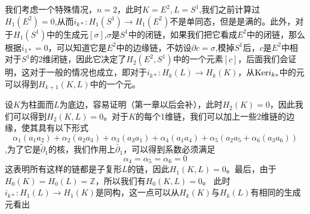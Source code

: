   我们考虑一个特殊情况，$n=2$，此时$K=E^{2},L=S^{1}$,我们之前计算过$H_{1}(E^{2})=0$,从而$i_{k*}:H_{1}(S^{1})\rightarrow H_{1}(E^{2})$不是单同态，但是是满的。此外，对于$H_{1}(S^{1})$中的生成元$[\sigma]$,$\sigma$是$S^{1}$中的闭链，如果我们把它看成$E^{2}$中的闭链，那么根据$i_{1*}=0$，可以知道它是$E^{2}$中的边缘链，不妨设$\partial c=\sigma$,模掉$S^{1}$后，$c$是$E^{2}$中相对于$S^{1}$的2维闭链，因此它决定了$H_{2}(E^{2},S^{1})$中的一个元素$[c]$，后面我们会证明，这对于一般的情况也成立，即对于$i_{k*}:H_{k}(L)\rightarrow H_{k}(K)$，从${\rm Ker} i_{k*}$中的元可以得到$H_{k+1}(K,L)$中的一个元。
  \begin{example}
  设$K$为柱面而$L$为底边，容易证明（第一章以后会补），此时$H_{2}(K)=0$，因此我们可以得到$H_{2}(K,L)=0$。对于$K$的每个1维链，我们可以加上一些2维链的边缘，使其具有以下形式$$\alpha_{1}(a_{1}a_{2})+\alpha_{2}(a_{2}a_{3})+\alpha_{3}(a_{3}a_{1})+\alpha_{4}(a_{1}a_{4})+\alpha_{5}(a_{2}a_{5}+\alpha_{6}(a_{3}a_{6}))$$,为了它是$\tilde{\partial}_{1}$的核，我们作用上$\tilde{\partial_{1}}$，可以得到系数必须满足$$\alpha_{4}=\alpha_{5}=\alpha_{6}=0$$这表明所有这样的链都是子复形$L$的链，因此$H_{1}(K,L)=0$。最后，由于$H_{0}(K)=H_{0}(L)=\mathbb{Z}$，所以我们有$H_{0}(K,L)=0$。
  此时$i_{k*}:H_{1}(L)\rightarrow H_{1}(K)$是同构，这一点可以从$H_{k}(K)$与$H_{k}(L)$有相同的生成元看出
  \end{example}
